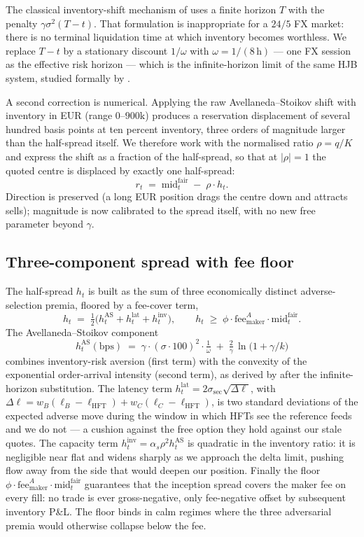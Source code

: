 The classical inventory-shift mechanism of \citet{avellaneda2008high}
uses a finite horizon $T$ with the penalty $\gamma\sigma^2(T-t)$.
That formulation is inappropriate for a $24/5$ FX market: there is
no terminal liquidation time at which inventory becomes worthless.
We replace $T-t$ by a stationary discount $1/\omega$ with
$\omega = 1/(8\,\mathrm{h})$ --- one FX session as the effective risk
horizon --- which is the infinite-horizon limit of the same HJB
system, studied formally by \citet{gueant2013dealing}.

A second correction is numerical. Applying the raw Avellaneda--Stoikov
shift with inventory in EUR (range $0$--$900\mathrm{k}$) produces a
reservation displacement of several hundred basis points at ten
percent inventory, three orders of magnitude larger than the
half-spread itself. We therefore work with the normalised ratio
$\rho = q/K$ and express the shift as a fraction of the half-spread,
so that at $|\rho|=1$ the quoted centre is displaced by exactly one
half-spread:
\[
  r_t \;=\; \mathrm{mid}^{\mathrm{fair}}_t \;-\; \rho \cdot h_t.
\]
Direction is preserved (a long EUR position drags the centre down
and attracts sells); magnitude is now calibrated to the spread
itself, with no new free parameter beyond $\gamma$.

\subsection{Three-component spread with fee floor}
\label{sec:quoter-spread}

The half-spread $h_t$ is built as the sum of three economically
distinct adverse-selection premia, floored by a fee-cover term,
\[
  h_t \;=\; \tfrac{1}{2}\bigl(h^{\mathrm{AS}}_t + h^{\mathrm{lat}}_t + h^{\mathrm{inv}}_t\bigr),
  \qquad h_t \;\geq\; \phi \cdot \mathrm{fee}^A_{\mathrm{maker}} \cdot \mathrm{mid}^{\mathrm{fair}}_t.
\]
The Avellaneda--Stoikov component
\[
  h^{\mathrm{AS}}_t(\mathrm{bps}) \;=\; \gamma \cdot (\sigma\cdot 100)^2 \cdot \tfrac{1}{\omega}
  \;+\; \tfrac{2}{\gamma}\,\ln\!\bigl(1 + \gamma/k\bigr)
\]
combines inventory-risk aversion (first term) with the convexity of
the exponential order-arrival intensity (second term), as derived by
\citet{avellaneda2008high} after the infinite-horizon substitution.
The latency term
$h^{\mathrm{lat}}_t = 2\sigma_{\mathrm{sec}}\sqrt{\Delta\ell}$, with
$\Delta\ell = w_B(\ell_B-\ell_{\mathrm{HFT}}) + w_C(\ell_C-\ell_{\mathrm{HFT}})$,
is two standard deviations of the expected adverse move during the
window in which HFTs see the reference feeds and we do not --- a
cushion against the free option they hold against our stale quotes.
The capacity term $h^{\mathrm{inv}}_t = \alpha_s \rho^2 h^{\mathrm{AS}}_t$
is quadratic in the inventory ratio: it is negligible near flat and
widens sharply as we approach the delta limit, pushing flow away
from the side that would deepen our position. Finally the floor
$\phi \cdot \mathrm{fee}^A_{\mathrm{maker}} \cdot \mathrm{mid}^{\mathrm{fair}}_t$
guarantees that the inception spread covers the maker fee on every
fill: no trade is ever gross-negative, only fee-negative offset by
subsequent inventory P\&L. The floor binds in calm regimes where the
three adversarial premia would otherwise collapse below the fee.

